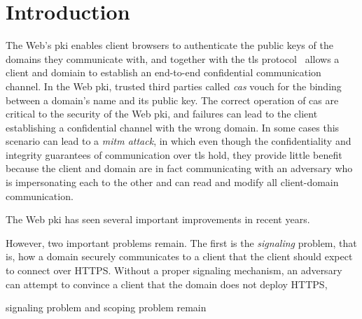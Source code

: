 \section{Introduction}
\label{sec:intro}


The Web's \ac{pki} enables client browsers to authenticate the public keys of
the domains they communicate with, and together with the \ac{tls}
protocol~\cite{rfc5246} allows a client and domiain to establish an end-to-end
confidential communication channel. In the Web \ac{pki}, trusted third parties
called \emph{\acp{ca}} vouch for the binding between a domain's name and its
public key. The correct operation of \acp{ca} are critical to the security of
the Web \ac{pki}, and failures can lead to the client establishing a
confidential channel with the wrong domain. In some cases this scenario can lead
to a \emph{\ac{mitm} attack}, in which even though the confidentiality and
integrity guarantees of communication over \ac{tls} hold, they provide little
benefit because the client and domain are in fact communicating with an
adversary who is impersonating each to the other and can read and modify all
client-domain communication.

The Web \ac{pki} has seen several important improvements in recent years.

However, two important problems remain. The first is the \emph{signaling}
problem, that is, how a domain securely communicates to a client that the client
should expect to connect over HTTPS. Without a proper signaling mechanism, an
adversary can attempt to convince a client that the domain does not deploy
HTTPS,

signaling problem and scoping problem remain


